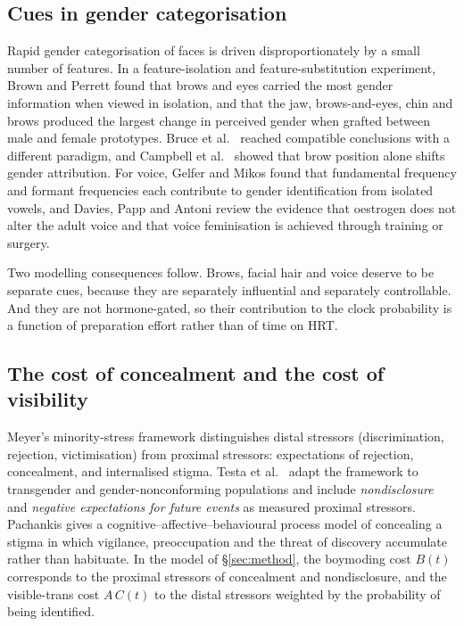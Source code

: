 \documentclass[11pt,a4paper]{article}
\theoremstyle{remark}
\begin{document}
\subsection{Cues in gender categorisation}

Rapid gender categorisation of faces is driven disproportionately by a small number of features. In a feature-isolation and feature-substitution experiment, Brown and Perrett \cite{brown1993} found that brows and eyes carried the most gender information when viewed in isolation, and that the jaw, brows-and-eyes, chin and brows produced the largest change in perceived gender when grafted between male and female prototypes. Bruce et al.\ \cite{bruce1993} reached compatible conclusions with a different paradigm, and Campbell et al.\ \cite{campbell1999} showed that brow position alone shifts gender attribution. For voice, Gelfer and Mikos \cite{gelfer2005} found that fundamental frequency and formant frequencies each contribute to gender identification from isolated vowels, and Davies, Papp and Antoni \cite{davies2015} review the evidence that oestrogen does not alter the adult voice and that voice feminisation is achieved through training or surgery.

Two modelling consequences follow. Brows, facial hair and voice deserve to be separate cues, because they are separately influential and separately controllable. And they are not hormone-gated, so their contribution to the clock probability is a function of preparation effort rather than of time on HRT.

\subsection{The cost of concealment and the cost of visibility}

Meyer's minority-stress framework \cite{meyer2003} distinguishes distal stressors (discrimination, rejection, victimisation) from proximal stressors: expectations of rejection, concealment, and internalised stigma. Testa et al.\ \cite{testa2015} adapt the framework to transgender and gender-nonconforming populations and include \emph{nondisclosure} and \emph{negative expectations for future events} as measured proximal stressors. Pachankis \cite{pachankis2007} gives a cognitive--affective--behavioural process model of concealing a stigma in which vigilance, preoccupation and the threat of discovery accumulate rather than habituate. In the model of \S\ref{sec:method}, the boymoding cost $B(t)$ corresponds to the proximal stressors of concealment and nondisclosure, and the visible-trans cost $A\,C(t)$ to the distal stressors weighted by the probability of being identified.
\end{document}
